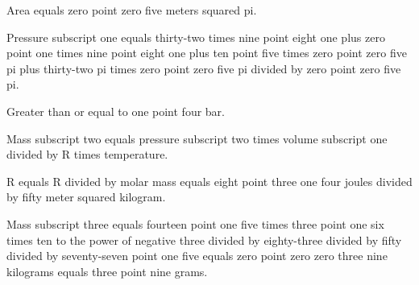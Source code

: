 Area equals zero point zero five meters squared pi. 

Pressure subscript one equals thirty-two times nine point eight one plus zero point one times nine point eight one plus ten point five times zero point zero five pi plus thirty-two pi times zero point zero five pi divided by zero point zero five pi. 

Greater than or equal to one point four bar.

Mass subscript two equals pressure subscript two times volume subscript one divided by R times temperature. 

R equals R divided by molar mass equals eight point three one four joules divided by fifty meter squared kilogram. 

Mass subscript three equals fourteen point one five times three point one six times ten to the power of negative three divided by eighty-three divided by fifty divided by seventy-seven point one five equals zero point zero zero three nine kilograms equals three point nine grams.
